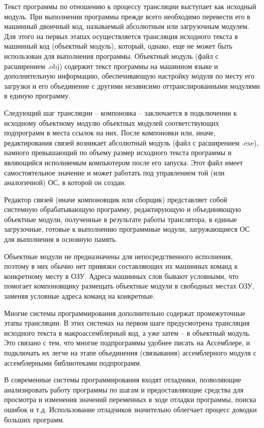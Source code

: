 Текст программы по отношению к процессу трансляции выступает как исходный модуль. При выполнении программы прежде всего необходимо перевести его в машинный двоичный код, называемый абсолютным или загрузочным модулем. Для этого на первых этапах осуществляется трансляция исходного текста в машинный код (объектный модуль), который, однако, еще не может быть использован для выполнения программы. Объектный модуль (файл с расширением .obj) содержит текст программы на машинном языке и дополнительную информацию, обеспечивающую настройку модуля по месту его загрузки и его объединение с другими независимо оттранслированными модулями в единую программу.

Следующий шаг трансляции – компоновка – заключается в подключении к исходному объектному модулю объектных модулей соответствующих подпрограмм в места ссылок на них. После компоновки или, иначе, редактирования связей возникает абсолютный модуль (файл с расширением .exe), намного превышающий по объему размер исходного текста программы и являющийся исполняемым компьютером после его запуска. Этот файл имеет самостоятельное значение и может работать под управлением той (или аналогичной) ОС, в которой он создан.

Редактор связей (иначе компоновщик или сборщик) представляет собой системную обрабатывающую программу, редактирующую и объединяющую объектные модули, полученные в результате работы транслятора, в единые загрузочные, готовые к выполнению программные модули, загружающиеся ОС для выполнения в основную память.

Объектные модули не предназначены для непосредственного исполнения, поэтому в них обычно нет привязки составляющих их машинных команд к конкретному месту в ОЗУ. Адреса машинных слов бывают условными, что помогает компоновщику размещать объектные модули в свободных местах ОЗУ, заменяя условные адреса команд на конкретные.

Многие системы программирования дополнительно содержат промежуточные этапы трансляции. В этих системах на первом шаге предусмотрена трансляция исходного текста в макроассемблерный код, а уже затем – в объектный модуль. Это связано с тем, что многие подпрограммы удобнее писать на Ассемблере, и подключать их легче на этапе объединения (связывания) ассемблерного модуля с ассемблерными библиотеками подпрограмм.

В современные системы программирования входят отладчики, позволяющие анализировать работу программы по шагам и предоставляющие средства для просмотра и изменения значений переменных в ходе отладки программы, поиска ошибок и т.д. Использование отладчиков значительно облегчает процесс доводки больших программ.

